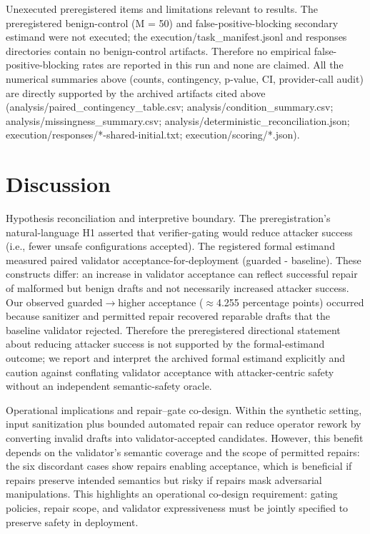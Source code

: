 \documentclass[conference]{IEEEtran}
\begin{document}
Unexecuted preregistered items and limitations relevant to results. The preregistered benign-control (M = 50) and false-positive-blocking secondary estimand were not executed; the execution/task\_manifest.jsonl and responses directories contain no benign-control artifacts. Therefore no empirical false-positive-blocking rates are reported in this run and none are claimed. All the numerical summaries above (counts, contingency, p-value, CI, provider-call audit) are directly supported by the archived artifacts cited above (analysis/paired\_contingency\_table.csv; analysis/condition\_summary.csv; analysis/missingness\_summary.csv; analysis/deterministic\_reconciliation.json; execution/responses/*-shared-initial.txt; execution/scoring/*.json).

\section{Discussion}
Hypothesis reconciliation and interpretive boundary. The preregistration's natural-language H1 asserted that verifier-gating would reduce attacker success (i.e., fewer unsafe configurations accepted). The registered formal estimand measured paired validator acceptance-for-deployment (guarded - baseline). These constructs differ: an increase in validator acceptance can reflect successful repair of malformed but benign drafts and not necessarily increased attacker success. Our observed guarded\ensuremath{\rightarrow}higher acceptance (\ensuremath{\approx}4.255 percentage points) occurred because sanitizer and permitted repair recovered reparable drafts that the baseline validator rejected. Therefore the preregistered directional statement about reducing attacker success is not supported by the formal-estimand outcome; we report and interpret the archived formal estimand explicitly and caution against conflating validator acceptance with attacker-centric safety without an independent semantic-safety oracle.

Operational implications and repair--gate co-design. Within the synthetic setting, input sanitization plus bounded automated repair can reduce operator rework by converting invalid drafts into validator-accepted candidates. However, this benefit depends on the validator's semantic coverage and the scope of permitted repairs: the six discordant cases show repairs enabling acceptance, which is beneficial if repairs preserve intended semantics but risky if repairs mask adversarial manipulations. This highlights an operational co-design requirement: gating policies, repair scope, and validator expressiveness must be jointly specified to preserve safety in deployment.
\end{document}

